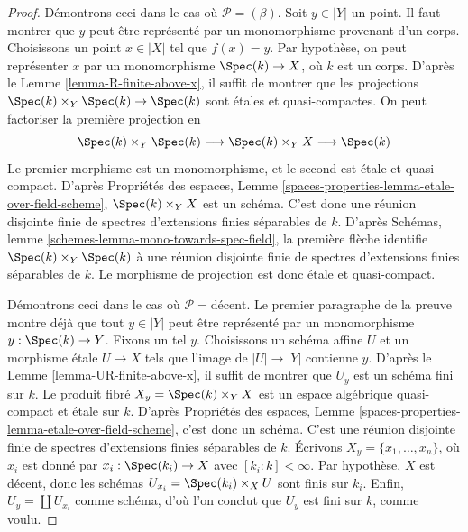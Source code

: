 \begin{proof}
Démontrons ceci dans le cas où $\mathcal{P} = (\beta)$. Soit $y \in |Y|$
un point. Il faut montrer que $y$ peut être représenté par un monomorphisme
provenant d'un corps. Choisissons un point $x \in |X|$ tel que $f(x) = y$.
Par hypothèse, on peut représenter $x$ par un monomorphisme
$\Spec(k) \to X$, où $k$ est un corps. D'après le
Lemme \ref{lemma-R-finite-above-x},
il suffit de montrer que les projections
$\Spec(k) \times_Y \Spec(k) \to \Spec(k)$
sont étales et quasi-compactes. On peut factoriser la première projection en
$$
\Spec(k) \times_Y \Spec(k)
\longrightarrow
\Spec(k) \times_Y X
\longrightarrow
\Spec(k)
$$
Le premier morphisme est un monomorphisme, et le second est étale et
quasi-compact. D'après
Propriétés des espaces,
Lemme \ref{spaces-properties-lemma-etale-over-field-scheme},
$\Spec(k) \times_Y X$ est un schéma. C'est donc une réunion disjointe finie
de spectres d'extensions finies séparables de $k$. D'après
Schémas, lemme \ref{schemes-lemma-mono-towards-spec-field},
la première flèche identifie $\Spec(k) \times_Y \Spec(k)$ à une réunion
disjointe finie de spectres d'extensions finies séparables de $k$.
Le morphisme de projection est donc étale et quasi-compact.

\medskip\noindent
Démontrons ceci dans le cas où $\mathcal{P} = \text{décent}$.
Le premier paragraphe de la preuve montre déjà que tout $y \in |Y|$ peut être
représenté par un monomorphisme $y : \Spec(k) \to Y$. Fixons un tel $y$.
Choisissons un schéma affine $U$ et un morphisme étale $U \to X$ tels que
l'image de $|U| \to |Y|$ contienne $y$. D'après le
Lemme \ref{lemma-UR-finite-above-x},
il suffit de montrer que $U_y$ est un schéma fini sur $k$. Le produit fibré
$X_y = \Spec(k) \times_Y X$ est un espace algébrique quasi-compact et étale
sur $k$. D'après
Propriétés des espaces,
Lemme \ref{spaces-properties-lemma-etale-over-field-scheme},
c'est donc un schéma. C'est une réunion disjointe finie de spectres
d'extensions finies séparables de $k$. Écrivons
$X_y = \{x_1, \ldots, x_n\}$, où $x_i$ est donné par
$x_i : \Spec(k_i) \to X$ avec $[k_i : k] < \infty$. Par hypothèse, $X$ est
décent, donc les schémas $U_{x_i} = \Spec(k_i) \times_X U$ sont finis sur
$k_i$. Enfin, $U_y = \coprod U_{x_i}$ comme schéma, d'où l'on conclut que
$U_y$ est fini sur $k$, comme voulu.


\end{proof}
